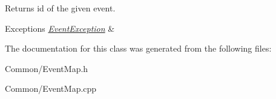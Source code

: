 Returns id of the given event. 


\begin{DoxyExceptions}{Exceptions}
{\em \hyperlink{class_common_1_1_event_exception}{Event\-Exception}} & \\
\hline
\end{DoxyExceptions}


The documentation for this class was generated from the following files\-:\begin{DoxyCompactItemize}
\item 
Common/Event\-Map.\-h\item 
Common/Event\-Map.\-cpp\end{DoxyCompactItemize}
